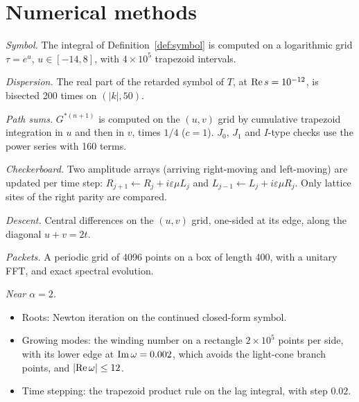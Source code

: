 \documentclass[11pt]{amsart}
\theoremstyle{definition}
\theoremstyle{remark}
\newcommand{\eps}{\varepsilon}
\begin{document}
\section{Numerical methods}\label{app:num}

\emph{Symbol.} The integral of Definition~\ref{def:symbol} is computed on a logarithmic grid $\tau=e^u$, $u\in[-14,8]$, with $4\times10^5$ trapezoid intervals.

\emph{Dispersion.} The real part of the retarded symbol of $T$, at ${\rm Re}\,s=10^{-12}$, is bisected 200 times on $(\lvert k\rvert,50)$.

\emph{Path sums.} $G^{*(n+1)}$ is computed on the $(u,v)$ grid by cumulative trapezoid integration in $u$ and then in $v$, times $1/4$ ($c=1$). $J_0$, $J_1$ and $I$-type checks use the power series with 160 terms.

\emph{Checkerboard.} Two amplitude arrays (arriving right-moving and left-moving) are updated per time step: $R_{j+1}\leftarrow R_j+i\eps\mu L_j$ and $L_{j-1}\leftarrow L_j+i\eps\mu R_j$. Only lattice sites of the right parity are compared.

\emph{Descent.} Central differences on the $(u,v)$ grid, one-sided at its edge, along the diagonal $u+v=2t$.

\emph{Packets.} A periodic grid of 4096 points on a box of length 400, with a unitary FFT, and exact spectral evolution.

\emph{Near $\alpha=2$.}
\begin{itemize}
\item Roots: Newton iteration on the continued closed-form symbol.
\item Growing modes: the winding number on a rectangle $2\times10^5$ points per side, with its lower edge at ${\rm Im}\,\omega=0.002$, which avoids the light-cone branch points, and $\lvert{\rm Re}\,\omega\rvert\le12$.
\item Time stepping: the trapezoid product rule on the lag integral, with step $0.02$.
\end{itemize}
\end{document}
